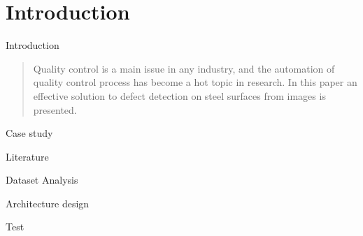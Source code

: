 \section{Introduction}
    \begin{frame}{Introduction}
        \begin{abstract}
            Quality control is a main issue in any industry, and the automation of quality control process has become a hot topic in research. In this paper an effective solution to defect detection on steel surfaces from images is presented.
        \end{abstract}
        \vskip 0.5cm
        \begin{description}
            \item<1->[1.] Case study
            \item<2->[2.] Literature
            \item<3->[3.] Dataset Analysis
            \item<4->[4.] Architecture design
            \item<5->[5.] Test
        \end{description}
    \end{frame}

